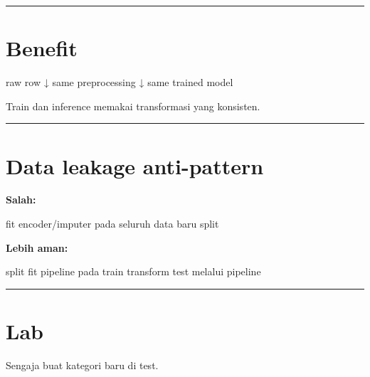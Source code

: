 \documentclass[
  indonesian,
  letterpaper,
  DIV=11,
  numbers=noendperiod]{scrreprt}
\newenvironment{Shaded}{\begin{snugshade}}{\end{snugshade}}
\newcommand{\NormalTok}[1]{\textcolor[rgb]{0.00,0.23,0.31}{#1}}
\begin{document}
\begin{center}\rule{0.5\linewidth}{0.5pt}\end{center}

\section{Benefit}\label{benefit}

\begin{Shaded}
\begin{Highlighting}[]
\NormalTok{raw row}
\NormalTok{  ↓}
\NormalTok{same preprocessing}
\NormalTok{  ↓}
\NormalTok{same trained model}
\end{Highlighting}
\end{Shaded}

Train dan inference memakai transformasi yang konsisten.

\begin{center}\rule{0.5\linewidth}{0.5pt}\end{center}

\section{Data leakage anti-pattern}\label{data-leakage-anti-pattern}

\textbf{Salah:}

\begin{Shaded}
\begin{Highlighting}[]
\NormalTok{fit encoder/imputer pada seluruh data}
\NormalTok{baru split}
\end{Highlighting}
\end{Shaded}

\textbf{Lebih aman:}

\begin{Shaded}
\begin{Highlighting}[]
\NormalTok{split}
\NormalTok{fit pipeline pada train}
\NormalTok{transform test melalui pipeline}
\end{Highlighting}
\end{Shaded}

\begin{center}\rule{0.5\linewidth}{0.5pt}\end{center}

\section{Lab}\label{lab-4}

Sengaja buat kategori baru di test.
\end{document}
